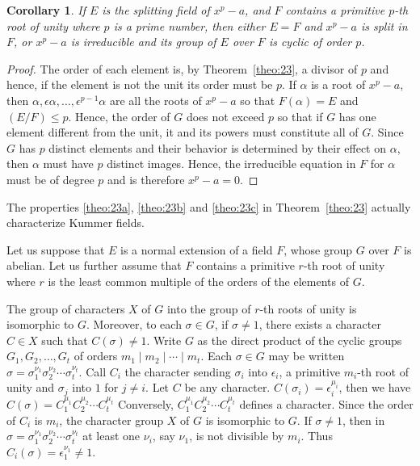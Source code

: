 \documentclass[10pt,leqno,a5paper]{book}
\newtheorem*{coro*}{Corollary}
\theoremstyle{definition}
\begin{document}
\begin{coro*}
If $E$ is the splitting field of $x^p - a$, and $F$ contains a primitive $p$-th root of unity where $p$ is a prime number, then either $E = F$ and $x^p - a$ is split in $F$, or $x^p - a$ is irreducible and its group of $E$ over $F$ is cyclic of order $p$.
\end{coro*}


\begin{proof}
The order of each element is, by Theorem~\ref{theo:23}, a divisor of $p$ and hence, if the element is not the unit its order must be $p$.
If $\alpha$ is a root of $x^p - a$, then $\alpha, \epsilon\alpha, \ldots, \epsilon^{p-1} \alpha$ are all the roots of $x^p - a$ so that $F(\alpha) = E$ and $(E/F) \leq p$.
Hence, the order of $G$ does not exceed $p$ so that if $G$ has one element different from the unit, it and its powers must constitute all of $G$.
Since $G$ has $p$ distinct elements and their behavior is determined by their effect on $\alpha$, then $\alpha$ must have $p$ distinct images.
Hence, the irreducible equation in $F$ for $\alpha$ must be of degree $p$ and is therefore $x^p - a = 0$.
\end{proof}


The properties \eqref{theo:23a}, \eqref{theo:23b} and \eqref{theo:23c} in Theorem~\ref{theo:23} actually characterize Kummer fields.


Let us suppose that $E$ is a normal extension of a field $F$, whose group $G$ over $F$ is abelian.
Let us further assume that $F$ contains a primitive $r$-th root of unity where $r$ is the least common multiple of the orders of the elements of $G$.

The group of characters $X$ of $G$ into the group of $r$-th roots of unity is isomorphic to $G$.
Moreover, to each $\sigma \in G$, if $\sigma \not= 1$, there exists a character $C \in X$ such that $C(\sigma) \not= 1$.
Write $G$ as the direct product of the cyclic groups $G_1, G_2, \ldots, G_t$ of orders $m_1 \mid m_2 \mid \cdots \mid m_t$.
Each $\sigma \in G$ may be written $\sigma = \sigma_1^{\nu_1} \sigma_2^{\nu_2} \cdots \sigma_t^{\nu_t}$.
Call $C_i$ the character sending $\sigma_i$ into $\epsilon_i$, a primitive $m_i$-th root of unity and $\sigma_j$ into $1$ for $j\not= i$.
Let $C$ be any character.
$C(\sigma_i) = \epsilon_i^{\mu_i}$, then we have $C(\sigma) = C_1^{\mu_1} C_2^{\mu_2} \cdots C_t^{\mu_t}$
Conversely, $C_1^{\mu_1} C_2^{\mu_2} \cdots C_t^{\mu_t}$ defines a character.
Since the order of $C_i$ is $m_i$, the character group $X$ of $G$ is isomorphic to $G$.
If $\sigma \not= 1$, then in $\sigma = \sigma_1^{\nu_1} \sigma_2^{\nu_2} \cdots \sigma_t^{\nu_t}$ at least one $\nu_i$, say $\nu_1$, is not divisible by $m_i$.
Thus $C_i(\sigma) = \epsilon_1^{\nu_1} \not= 1$.
\end{document}
